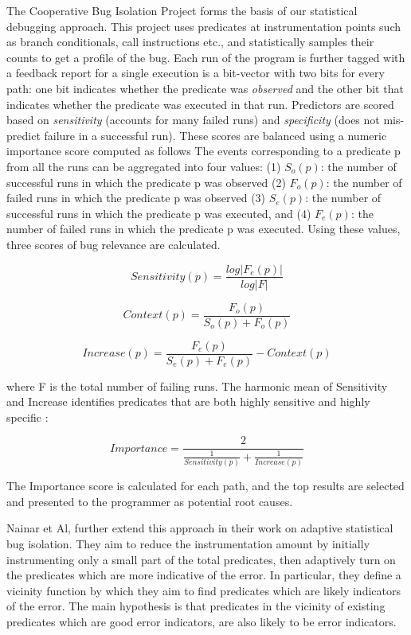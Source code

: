 
The Cooperative Bug Isolation Project forms the basis of our statistical debugging approach.
This project uses predicates at instrumentation points such as branch conditionals, call instructions etc., and statistically samples their counts to get a profile of the bug.
Each run of the program is further tagged with a feedback report for a single execution is a bit-vector with two bits for every path: one bit indicates whether the predicate was \emph{observed} and the other bit that indicates whether the predicate was executed in that run.
Predictors are scored based on \emph{sensitivity} (accounts for many failed runs) and \emph{specificity} (does not mis-predict failure in a successful run).
These scores are balanced using a numeric importance score computed as follows
The events corresponding to a predicate p from all the runs can be aggregated into four values: (1) $S_{o}(p)$: the number of successful runs in which the predicate p was observed (2) $F_{o}(p)$: the number of failed runs in which the predicate  p was observed (3) $S_{e}(p)$: the number of successful runs in which the predicate p was executed, and (4) $F_{e}(p)$: the number of failed runs in which the predicate p was executed.
Using these values, three scores of bug relevance are calculated.

\begin{equation}
    \label{eq:sensitivity}
    Sensitivity(p) = \frac{log|F_{e}(p)|}{log|F|}
\end{equation}

\begin{equation}
    \label{eq:context}
    Context(p) = \frac{F_{o}(p)}{S_{o}(p) + F_{o}(p)}
\end{equation}

\begin{equation}
    \label{eq:increase}
    Increase(p) = \frac{F_{e}(p)}{S_{e}(p) + F_{e}(p)} - Context(p)
\end{equation}

where F is the total number of failing runs. The harmonic mean of Sensitivity and Increase identifies predicates that are both highly sensitive and highly specific :

\begin{equation}
    \label{eq:importance}
    Importance = \frac{2}{\frac{1}{Sensitivity(p)}+\frac{1}{Increase(p)}}
\end{equation}

The Importance score is calculated for each path, and the top results are selected and presented to the programmer as potential root causes.

Nainar et Al\cite{}, further extend this approach in their work on adaptive statistical bug isolation.
They aim to reduce the instrumentation amount by initially instrumenting only a small part of the total predicates, then adaptively turn on the predicates which are more indicative of the error.
In particular, they define a vicinity function by which they aim to find predicates which are likely indicators of the error.
The main hypothesis is that predicates in the vicinity of existing predicates which are good error indicators, are also likely to be error indicators.

